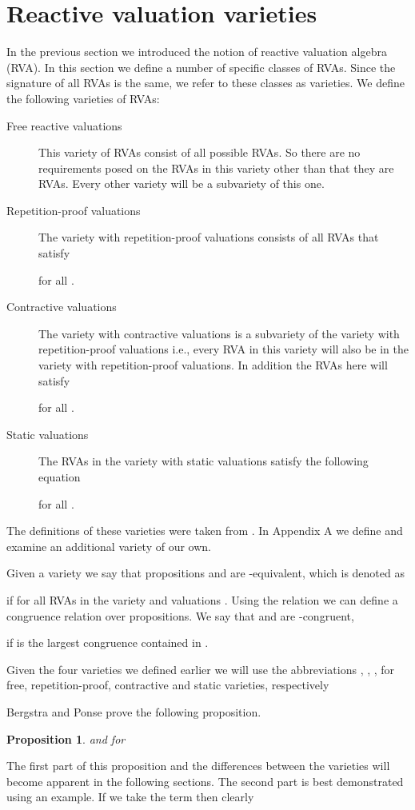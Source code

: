 \documentclass[a4paper,twoside,openright]{report}
\newtheorem{prop}[theorem]{Proposition}
\begin{document}
\section{Reactive valuation varieties}
In the previous section we introduced the notion of reactive valuation algebra (RVA). In this section we define a number of specific classes of RVAs. Since the signature of all RVAs is the same, we refer to these classes as varieties. We define the following varieties of RVAs:
\begin{description}
\item[Free reactive valuations] This variety of RVAs consist of all possible RVAs. So there are no requirements posed on the RVAs in this variety other than that they are RVAs. Every other variety will be a subvariety of this one.
\item[Repetition-proof valuations] The variety with repetition-proof valuations consists of all RVAs that satisfy

for all .
\item[Contractive valuations] The variety with contractive valuations is a subvariety of the variety with repetition-proof valuations i.e., every RVA in this variety will also be in the variety with repetition-proof valuations. In addition the RVAs here will satisfy

for all .
\item[Static valuations] The RVAs in the variety with static valuations satisfy the following equation

for all .
\end{description}
The definitions of these varieties were taken from \cite{main}. In Appendix A we define and examine an additional variety of our own.

Given a variety  we say that propositions  and  are -equivalent, which is denoted as

if  for all RVAs  in the variety  and valuations . Using the relation  we can define a congruence relation over propositions. We say that  and  are -congruent,

if  is the largest congruence contained in .

Given the four varieties we defined earlier we will use the abbreviations , , ,  for free, repetition-proof, contractive and static varieties, respectively

Bergstra and Ponse prove the following proposition.
\begin{prop}\label{variety relation prop}
 and  for 
\end{prop}
The first part of this proposition and  the differences between the varieties will become apparent in the following sections. The second part is best demonstrated using an example. If we take the term  then clearly
 
\end{document}
